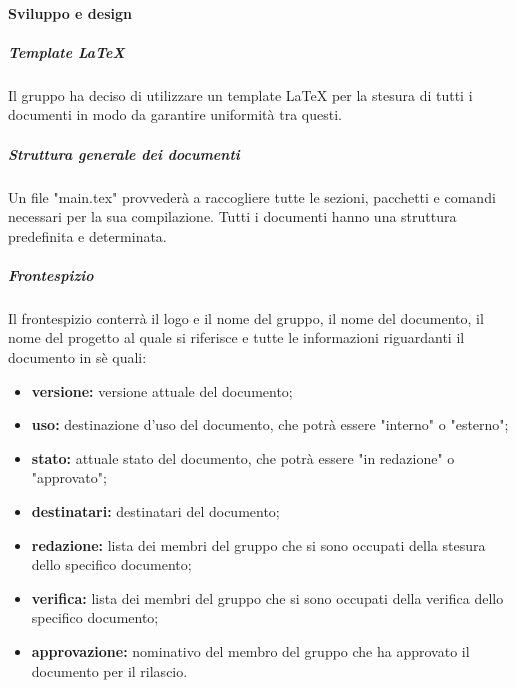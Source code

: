			\paragraph{Sviluppo e design}
				\subparagraph{Template LaTeX}
					Il gruppo ha deciso di utilizzare un template LaTeX per la stesura di tutti i documenti in modo da garantire uniformità tra questi.	
				\subparagraph{Struttura generale dei documenti}		
					Un file "main.tex" provvederà a raccogliere tutte le sezioni, pacchetti e comandi necessari per la sua compilazione. Tutti i documenti hanno una struttura predefinita e determinata.
				\subparagraph{Frontespizio}	
					Il frontespizio conterrà il logo e il nome del gruppo, il nome del documento, il nome del progetto al quale si riferisce e tutte le informazioni riguardanti il documento in sè quali:
					\begin{itemize}
						\item \textbf{versione:} versione attuale del documento;
						\item \textbf{uso:} destinazione d'uso del documento, che potrà essere "interno" o "esterno";
						\item \textbf{stato:} attuale stato del documento, che potrà essere "in redazione" o "approvato";
						\item \textbf{destinatari:} destinatari del documento;
						\item \textbf{redazione:} lista dei membri del gruppo che si sono occupati della stesura dello specifico documento;
						\item \textbf{verifica:} lista dei membri del gruppo che si sono occupati della verifica dello specifico documento;
						\item \textbf{approvazione:} nominativo del membro del gruppo che ha approvato il documento per il rilascio.
					\end{itemize}
					
